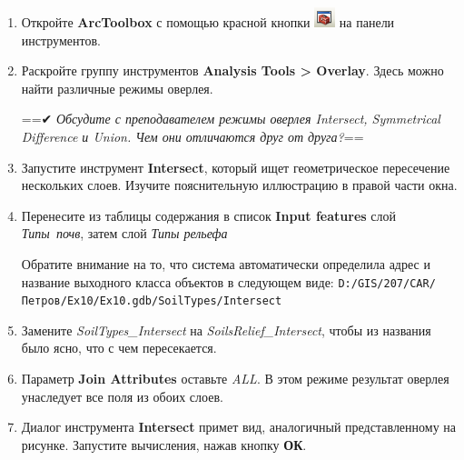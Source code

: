 \documentclass[]{book}
\theoremstyle{definition}
\theoremstyle{definition}
\theoremstyle{definition}
\theoremstyle{remark}
\begin{document}
\begin{enumerate}
\def\labelenumi{\arabic{enumi}.}
\item
  Откройте \textbf{ArcToolbox} с помощью красной кнопки
  \includegraphics{images/Ex10/image8.png} на панели инструментов.
\item
  Раскройте группу инструментов \textbf{Analysis Tools \textgreater{}
  Overlay}. Здесь можно найти различные режимы оверлея.

  ==✔︎ \emph{Обсудите с преподавателем режимы оверлея Intersect,
  Symmetrical Difference и Union. Чем они отличаются друг от друга?}==
\item
  Запустите инструмент \textbf{Intersect}, который ищет геометрическое
  пересечение нескольких слоев. Изучите пояснительную иллюстрацию в
  правой части окна.
\item
  Перенесите из таблицы содержания в список \textbf{Input features} слой
  \emph{Типы~почв}, затем слой \emph{Типы рельефа}

  Обратите внимание на то, что система автоматически определила адрес и
  название выходного класса объектов в следующем виде:
  \texttt{D:/GIS/207/CAR/Петров/Ex10/Ex10.gdb/SoilTypes/Intersect}
\item
  Замените \emph{SoilTypes\_Intersect} на \emph{SoilsRelief\_Intersect},
  чтобы из названия было ясно, что с чем пересекается.
\item
  Параметр \textbf{Join Attributes} оставьте \emph{ALL}. В этом режиме
  результат оверлея унаследует все поля из обоих слоев.
\item
  Диалог инструмента \textbf{Intersect} примет вид, аналогичный
  представленному на рисунке. Запустите вычисления, нажав кнопку
  \textbf{ОК}.


\end{enumerate}
\end{document}
